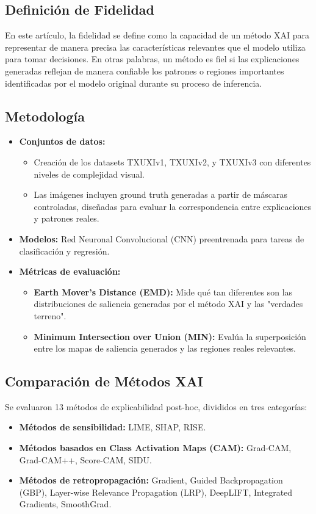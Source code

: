 \documentclass{report}
\begin{document}
\subsection{Definición de Fidelidad}
En este artículo, la fidelidad se define como la capacidad de un método XAI para representar de manera precisa las características relevantes que el modelo utiliza para tomar decisiones. En otras palabras, un método es fiel si las explicaciones generadas reflejan de manera confiable los patrones o regiones importantes identificadas por el modelo original durante su proceso de inferencia.

\subsection{Metodología}
\begin{itemize}
    \item \textbf{Conjuntos de datos:} 
    \begin{itemize}
        \item Creación de los datasets TXUXIv1, TXUXIv2, y TXUXIv3 con diferentes niveles de complejidad visual.
        \item Las imágenes incluyen ground truth generadas a partir de máscaras controladas, diseñadas para evaluar la correspondencia entre explicaciones y patrones reales.
    \end{itemize}
    \item \textbf{Modelos:} Red Neuronal Convolucional (CNN) preentrenada para tareas de clasificación y regresión.
    \item \textbf{Métricas de evaluación:}
    \begin{itemize}
        \item \textbf{Earth Mover’s Distance (EMD):} Mide qué tan diferentes son las distribuciones de saliencia generadas por el método XAI y las "verdades terreno".
        \item \textbf{Minimum Intersection over Union (MIN):} Evalúa la superposición entre los mapas de saliencia generados y las regiones reales relevantes.
    \end{itemize}
\end{itemize}

\subsection{Comparación de Métodos XAI}
Se evaluaron 13 métodos de explicabilidad post-hoc, divididos en tres categorías:
\begin{itemize}
    \item \textbf{Métodos de sensibilidad:} LIME, SHAP, RISE.
    \item \textbf{Métodos basados en Class Activation Maps (CAM):} Grad-CAM, Grad-CAM++, Score-CAM, SIDU.
    \item \textbf{Métodos de retropropagación:} Gradient, Guided Backpropagation (GBP), Layer-wise Relevance Propagation (LRP), DeepLIFT, Integrated Gradients, SmoothGrad.
\end{itemize}
\end{document}
